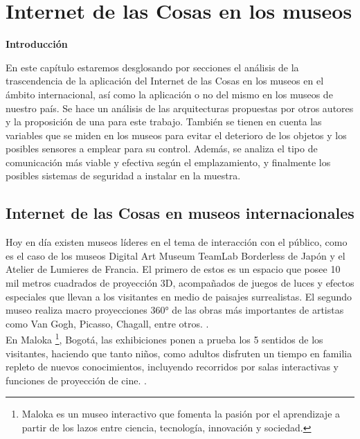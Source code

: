 \chapter{Internet de las Cosas en los museos} \label{cap:aproxTeoricas}

        \textbf{\Large Introducción}\newline

        En este capítulo estaremos desglosando por secciones el análisis de la trascendencia de la aplicación del Internet de las Cosas en los museos en el ámbito internacional, así como la aplicación o no del mismo en los museos de nuestro país.
        Se hace un análisis de las arquitecturas propuestas por otros autores y la proposición de una para este trabajo.
        También se tienen en cuenta las variables que se miden en los museos para evitar el deterioro de los objetos y los posibles sensores a emplear para su control.
        Además, se analiza el tipo de comunicación más viable y efectiva según el emplazamiento, y finalmente los posibles sistemas de seguridad a instalar en la muestra.
    
    \section{Internet de las Cosas en museos internacionales}\label{sec:iotMundo}
        
        Hoy en día existen museos líderes en el tema de interacción con el público, como es el caso de los museos Digital Art Museum TeamLab Borderless de Japón y el Atelier de Lumieres de Francia. El primero de estos es un espacio que posee 10 mil metros cuadrados de proyección 3D, acompañados de juegos de luces y efectos especiales que llevan a los visitantes en medio de paisajes surrealistas. El segundo museo realiza macro proyecciones 360° de las obras más importantes de artistas como Van Gogh, Picasso, Chagall, entre otros. \cite{museoInterSalaLimpia}.\\

        En Maloka \footnote{Maloka es un museo interactivo que fomenta la pasión por el aprendizaje a partir de los lazos entre ciencia, tecnología, innovación y sociedad.}, Bogotá, las exhibiciones ponen a prueba los 5 sentidos de los visitantes, haciendo que tanto niños, como adultos disfruten un tiempo en familia repleto de nuevos conocimientos, incluyendo recorridos por salas interactivas y funciones de proyección de cine. \cite{maloka}.\\

